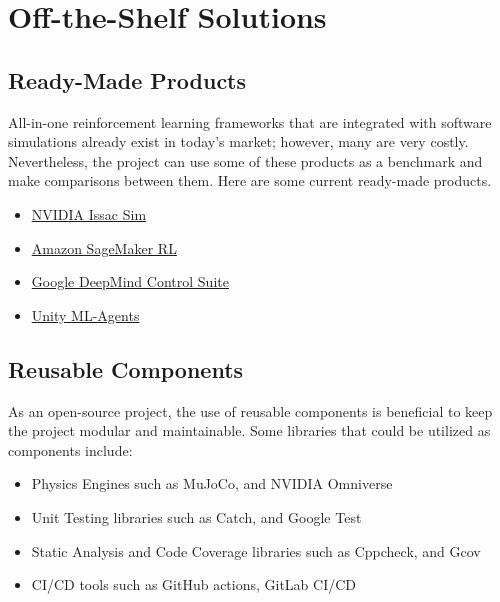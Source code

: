 \documentclass[12pt]{article}
\newcommand{\lips}{\textit{Insert your content here.}}
\begin{document}
\section{Off-the-Shelf Solutions}
\subsection{Ready-Made Products}

All-in-one reinforcement learning frameworks that are integrated with software simulations already exist in today’s market; however, many are very costly. Nevertheless, the project can use some of these products as a benchmark and make comparisons between them. Here are some current ready-made products.
\begin{itemize}
  \item \href{https://developer.nvidia.com/isaac/sim}{NVIDIA Issac Sim}
  \item \href{https://aws.amazon.com/sagemaker/}{Amazon SageMaker RL}
  \item \href{https://github.com/google-deepmind/dm_control?tab=readme-ov-file}{Google DeepMind Control Suite}
  \item \href{https://github.com/Unity-Technologies/ml-agents}{Unity ML-Agents}
\end{itemize}

\subsection{Reusable Components}
As an open-source project, the use of reusable components is beneficial to keep the project modular and maintainable. Some libraries that could be utilized as components include:
\begin{itemize}
  \item Physics Engines such as MuJoCo, and NVIDIA Omniverse
  \item Unit Testing libraries such as Catch, and Google Test
  \item Static Analysis and Code Coverage libraries such as Cppcheck, and Gcov
  \item CI/CD tools such as GitHub actions, GitLab CI/CD
\end{itemize}
\end{document}
